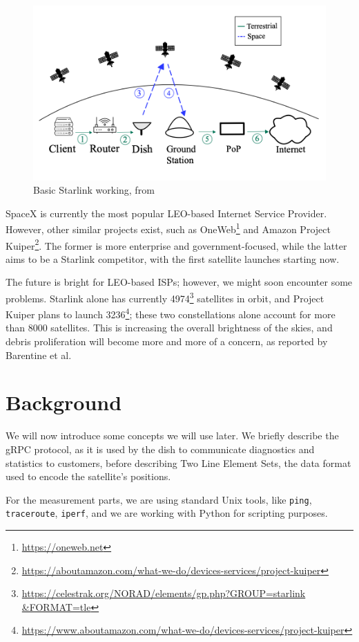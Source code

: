 \documentclass[IN,11pt,twoside,openright,idp,english]{tumthesis}
\begin{document}
\begin{figure}
    \centering
    \includegraphics[width=0.6\columnwidth]{img/starlink-101.png}
    \caption{Basic Starlink working, from \cite{izhikevich2023democratizing}}
    \label{fig:starlink-101}
\end{figure}      
    
SpaceX is currently the most popular LEO-based Internet Service Provider. However, other similar projects exist, such as
OneWeb\footnote{\url{https://oneweb.net}} and Amazon Project
Kuiper\footnote{\url{https://aboutamazon.com/what-we-do/devices-services/project-kuiper}}. The former is more enterprise
and government-focused, while the latter aims to be a Starlink competitor, with the first satellite launches starting
now.

The future is bright for LEO-based ISPs; however, we might soon encounter some problems. Starlink alone has currently
4974\footnote{\url{https://celestrak.org/NORAD/elements/gp.php?GROUP=starlink &FORMAT=tle}} satellites in orbit, and
Project Kuiper plans to launch
3236\footnote{\url{https://www.aboutamazon.com/what-we-do/devices-services/project-kuiper}}; these two constellations
alone account for more than 8000 satellites. This is increasing the overall brightness of the skies, and debris
proliferation will become more and more of a concern, as reported by Barentine et al. \cite{cite-key}
    
\section{Background}

We will now introduce some concepts we will use later. We briefly describe the gRPC protocol, as it is used by the dish
to communicate diagnostics and statistics to customers, before describing Two Line Element Sets, the data format used to
encode the satellite's positions. 

For the measurement parts, we are using standard Unix tools, like \texttt{ping}, \texttt{traceroute}, \texttt{iperf},
and we are working with Python for scripting purposes.
\end{document}
